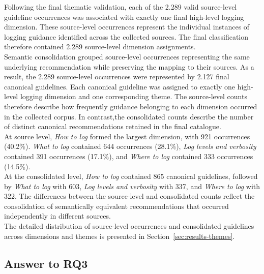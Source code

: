 Following the final thematic validation, each of the 2.289 valid source-level
guideline occurrences was associated with exactly one final high-level logging
dimension. These source-level occurrences represent the individual instances of
logging guidance identified across the collected sources. The final classification
therefore contained 2.289 source-level dimension assignments.
\\
Semantic consolidation grouped source-level occurrences representing the same
underlying recommendation while preserving the mapping to their sources.
As a result, the 2.289 source-level occurrences were represented by 2.127 final
canonical guidelines. Each canonical guideline was assigned to exactly one
high-level logging dimension and one corresponding theme. The source-level counts
therefore describe how frequently guidance belonging to each dimension occurred in
the collected corpus. In contrast,the consolidated counts describe the number of
distinct canonical recommendations retained in the final catalogue.
\\
At source level, \textit{How to log} formed the largest dimension, with 921
occurrences (40.2\%). \textit{What to log} contained 644 occurrences (28.1\%),
\textit{Log levels and verbosity} contained 391 occurrences (17.1\%), and
\textit{Where to log} contained 333 occurrences (14.5\%).
\\
At the consolidated level, \textit{How to log} contained 865 canonical guidelines,
followed by \textit{What to log} with 603, \textit{Log levels and verbosity} with
337, and \textit{Where to log} with 322. The differences between the source-level
and consolidated counts reflect the consolidation of semantically equivalent
recommendations that occurred independently in different sources.
\\
The detailed distribution of source-level occurrences and consolidated guidelines
across dimensions and themes is presented in
Section~\ref{sec:results-themes}.

\subsection{Answer to RQ3}

